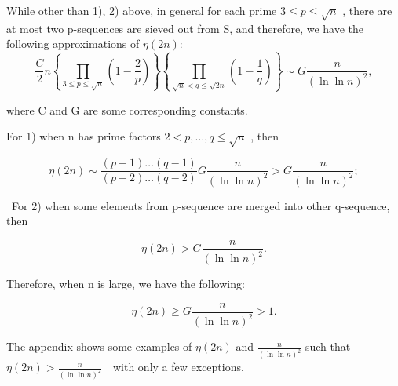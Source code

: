 \documentclass{aomart}
\begin{document}
\vspace{1\baselineskip}

While other than 1), 2) above, in general for each prime \( 3\leq p\leq\sqrt{n}\) , there are at most two p-sequences are sieved out from S, and therefore, we have the following approximations of \( \eta (2n)\):
\vspace{1\baselineskip}
\begin{equation}
\frac{C }{2} n\left\{  \prod_{3\leq p\leq\sqrt{n}}^{}\left(1-\frac{2}{p}\right)\right\}\left\{ \prod_{\sqrt{n}<q\leq\sqrt{2n}}^{}\left(1-\frac{1}{q}\right)\right\}  \sim  G\frac{n}{(\ln \ln  n)^{2}}   ,
\end{equation}

\vspace{1\baselineskip}

where C and G are some corresponding constants.
\vspace{1\baselineskip}

For 1) when n has prime factors \( 2<p, \ldots , q\leq\sqrt{n}\) {,  then }

\begin{equation}
\eta\left(2n\right)  \sim \frac{\left(p-1\right)\ldots (q-1)  }{\left(p-2\right)\ldots (q-2)  } G\frac{n}{(\ln \ln  n)^{2}} > G\frac{n}{(\ln \ln  n)^{2}} ;
\end{equation}

\vspace{1\baselineskip}


\ For 2) when some elements from p-sequence are merged into other q-sequence, then


\begin{equation}
    \eta\left(2n\right)> G\frac{n}{(\ln \ln  n)^{2}}  .
\end{equation}

\vspace{1\baselineskip}

Therefore, when n is large, we have the following:

\begin{equation}
    \eta\left(2n\right)\geq  G\frac{n}{(\ln \ln  n)^{2}}>1 .
\end{equation}
\vspace{1\baselineskip}

The appendix shows some examples of \( \eta\left(2n\right)\) and \(\frac{n}{(\ln \ln  n)^{2}}\) such that \( \eta\left(2n\right)>\frac{n}{(\ln \ln  n)^{2}}\)\ \ with only a few exceptions.  
\vspace{1\baselineskip}
\end{document}
